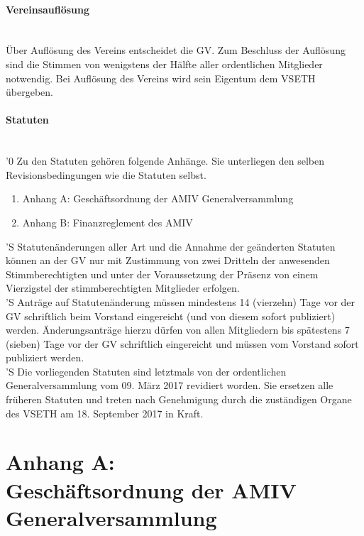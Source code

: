 \documentclass[a4paper,11pt]{article}
\newcommand{\nl}{\\[1.5ex]}
\begin{document}
\paragraph{Vereinsauflösung}\label{Vereinsauflösung} \ \\
Über Auflösung des Vereins entscheidet die GV. Zum Beschluss der Auflösung sind die Stimmen von wenigstens der Hälfte aller ordentlichen Mitglieder notwendig. Bei Auflösung des Vereins wird sein Eigentum dem VSETH übergeben.


\paragraph{Statuten}\label{Statuten} \ \\
'0 Zu den Statuten gehören folgende Anhänge. Sie unterliegen den selben Revisionsbedingungen wie die Statuten selbst.
\begin{enumerate}
    \item Anhang A: Geschäftsordnung der AMIV Generalversammlung
    \item Anhang B: Finanzreglement des AMIV
\end{enumerate}
'S Statutenänderungen aller Art und die Annahme der geänderten Statuten können an der GV nur mit Zustimmung von zwei Dritteln der anwesenden Stimmberechtigten und unter der Voraussetzung der Präsenz von einem Vierzigstel der stimmberechtigten Mitglieder erfolgen. \nl
'S Anträge auf Statutenänderung müssen mindestens 14 (vierzehn) Tage vor der GV schriftlich beim Vorstand eingereicht (und von diesem sofort publiziert) werden. Änderungsanträge hierzu dürfen von allen Mitgliedern bis spätestens 7 (sieben) Tage vor der GV schriftlich eingereicht und müssen vom Vorstand sofort publiziert werden. \nl
'S Die vorliegenden Statuten sind letztmals von der ordentlichen Generalversammlung vom 09. März 2017 revidiert worden. Sie ersetzen alle früheren Statuten und treten nach Genehmigung durch die zuständigen Organe des VSETH am 18. September 2017 in Kraft.










\newpage
\section*{Anhang A:\\ Geschäftsordnung der AMIV Generalversammlung}
\end{document}
